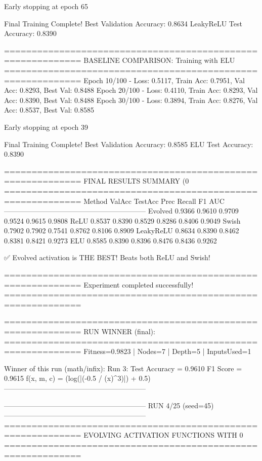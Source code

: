 Early stopping at epoch 65

Final Training Complete!
Best Validation Accuracy: 0.8634
LeakyReLU Test Accuracy: 0.8390

============================================================
BASELINE COMPARISON: Training with ELU
============================================================
Epoch  10/100 - Loss: 0.5117, Train Acc: 0.7951, Val Acc: 0.8293, Best Val: 0.8488
Epoch  20/100 - Loss: 0.4110, Train Acc: 0.8293, Val Acc: 0.8390, Best Val: 0.8488
Epoch  30/100 - Loss: 0.3894, Train Acc: 0.8276, Val Acc: 0.8537, Best Val: 0.8585

Early stopping at epoch 39

Final Training Complete!
Best Validation Accuracy: 0.8585
ELU Test Accuracy: 0.8390

============================================================
FINAL RESULTS SUMMARY (0%
============================================================
Method             ValAcc     TestAcc    Prec       Recall     F1         AUC
------------------------------------------------------------
Evolved            0.9366     0.9610     0.9709     0.9524     0.9615     0.9808
ReLU               0.8537     0.8390     0.8529     0.8286     0.8406     0.9049
Swish              0.7902     0.7902     0.7541     0.8762     0.8106     0.8909
LeakyReLU          0.8634     0.8390     0.8462     0.8381     0.8421     0.9273
ELU                0.8585     0.8390     0.8396     0.8476     0.8436     0.9262

✅ Evolved activation is THE BEST! Beats both ReLU and Swish!

============================================================
Experiment completed successfully!
============================================================

============================================================
RUN WINNER (final):
============================================================
Fitness=0.9823 | Nodes=7 | Depth=5 | InputsUsed=1

Winner of this run (math/infix):
  Run 3:
     Test Accuracy = 0.9610
     F1 Score      = 0.9615
     f(x, m, c)    = (log(|(-0.5 / (x)^3)|) + 0.5)
------------------------------------------------------------

------------------------------------------------------------
RUN 4/25 (seed=45)
------------------------------------------------------------
============================================================
EVOLVING ACTIVATION FUNCTIONS
WITH 0%
============================================================

